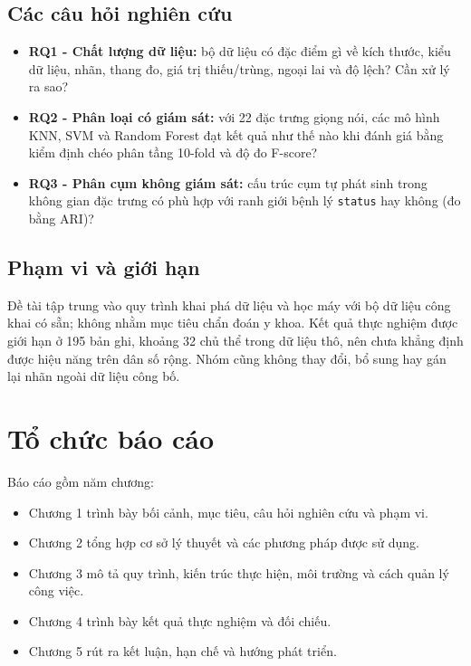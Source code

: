 \subsection{Các câu hỏi nghiên cứu}
\begin{itemize}
    \item \textbf{RQ1 - Chất lượng dữ liệu:} bộ dữ liệu có đặc điểm gì về kích thước, kiểu
          dữ liệu, nhãn, thang đo, giá trị thiếu/trùng, ngoại lai và độ lệch? Cần xử lý ra sao?
    \item \textbf{RQ2 - Phân loại có giám sát:} với 22 đặc trưng giọng nói, các mô hình
          KNN, SVM và Random Forest đạt kết quả như thế nào khi đánh giá bằng kiểm định chéo
          phân tầng 10-fold và độ đo F-score?
    \item \textbf{RQ3 - Phân cụm không giám sát:} cấu trúc cụm tự phát sinh trong không gian
          đặc trưng có phù hợp với ranh giới bệnh lý \texttt{status} hay không (đo bằng ARI)?
\end{itemize}

\subsection{Phạm vi và giới hạn}
Đề tài tập trung vào quy trình khai phá dữ liệu và học máy với bộ dữ liệu công khai có sẵn;
không nhằm mục tiêu chẩn đoán y khoa. Kết quả thực nghiệm được giới hạn ở 195 bản ghi, khoảng
32 chủ thể trong dữ liệu thô, nên chưa khẳng định được hiệu năng trên dân số rộng. Nhóm cũng
không thay đổi, bổ sung hay gán lại nhãn ngoài dữ liệu công bố.

\section{Tổ chức báo cáo}

Báo cáo gồm năm chương:
\begin{itemize}
    \item Chương 1 trình bày bối cảnh, mục tiêu, câu hỏi nghiên cứu và phạm vi.
    \item Chương 2 tổng hợp cơ sở lý thuyết và các phương pháp được sử dụng.
    \item Chương 3 mô tả quy trình, kiến trúc thực hiện, môi trường và cách quản lý công việc.
    \item Chương 4 trình bày kết quả thực nghiệm và đối chiếu.
    \item Chương 5 rút ra kết luận, hạn chế và hướng phát triển.
\end{itemize}

